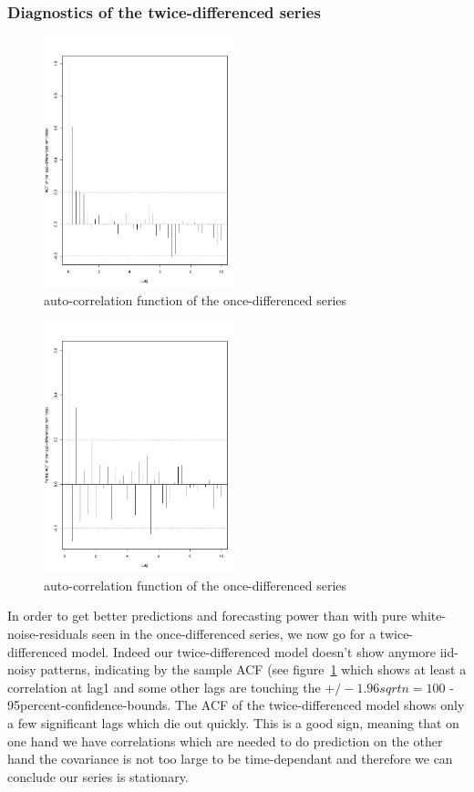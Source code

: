 \documentclass[11pt,a4paper]{article}
\begin{document}
\subsubsection{Diagnostics of the twice-differenced series}
\begin{figure}
\centering
\includegraphics[angle=0,
width=0.5\textwidth]{diff2_acf}
\caption{auto-correlation function of the once-differenced series
\label{fig:diff2_acf}}
\end{figure}
\begin{figure}
\centering
\includegraphics[angle=0,
width=0.5\textwidth]{diff2_pacf}
\caption{auto-correlation function of the once-differenced series
\label{fig:diff2_pacf}}
\end{figure}
In order to get better predictions and forecasting power than with pure white-noise-residuals seen in the once-differenced series, we now go for a twice-differenced model. Indeed our twice-differenced model doesn't show anymore iid-noisy patterns, indicating by the sample ACF (see figure~\ref{fig:diff2_acf} which shows at least a correlation at lag1 and some other lags are touching the $+/-1.96sqrt{n=100}$ - 95percent-confidence-bounds. The ACF of the twice-differenced model shows only a few significant lags which die out quickly. This is a good sign, meaning that on one hand we have correlations which are needed to do prediction on the other hand the covariance is not too large to be time-dependant and therefore we can conclude our series is stationary.
\end{document}
